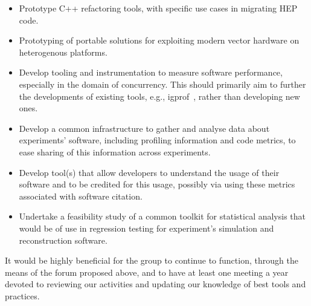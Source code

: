 \documentclass[12pt,a4paper]{article}
\begin{document}
\begin{itemize}
\item
    Prototype C++ refactoring tools, with specific use cases in migrating
  HEP code.
  \item
    Prototyping of portable solutions for exploiting modern vector
  hardware on heterogenous platforms.
  \item
    Develop tooling and instrumentation to measure software performance,
  especially in the domain of concurrency. This should primarily aim to
  further the developments of existing tools, e.g.,
  igprof~\cite{Eulisse:2005zz}, rather than developing new ones.
  \item
  Develop a common infrastructure to gather and analyse data about
  experiments' software, including profiling information and code
  metrics, to ease sharing of this information across experiments.
  \item 
  Develop tool(s) that allow developers to understand the usage of their
  software and to be credited for this usage, possibly via using these metrics
  associated with software citation.
  \item
    Undertake a feasibility study of a common toolkit for statistical
  analysis that would be of use in regression testing for experiment's
  simulation and reconstruction software.
\end{itemize}

It would be highly beneficial for the group to continue to function,
through the means of the forum proposed above, and to have at least one
meeting a year devoted to reviewing our activities and updating our
knowledge of best tools and practices.

\sloppy
\raggedright
\clearpage
\printbibliography[title={References},heading=bibintoc]
\end{document}
